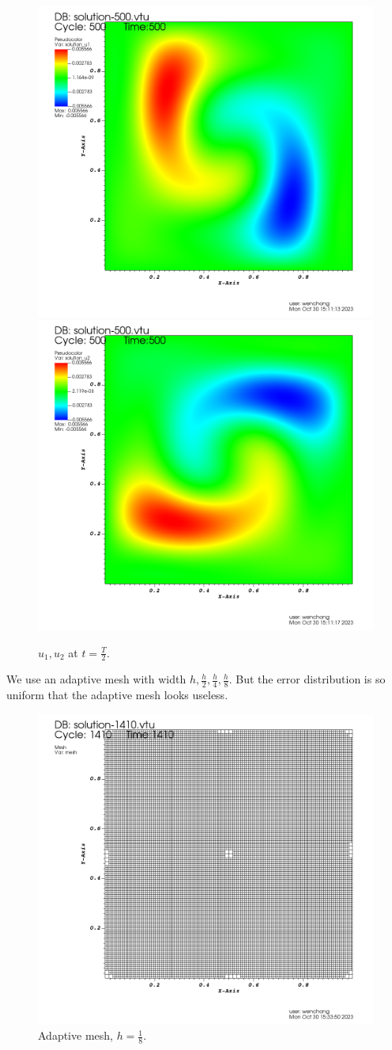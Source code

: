 \documentclass[lang=en,11pt,a4paper]{elegantpaper}
\begin{document}
\begin{figure}[H]
\begin{minipage}[t]{0.4\linewidth}
        \includegraphics[width=0.8\linewidth]{png/ux_t=0.5.png}
        \includegraphics[width=0.8\linewidth]{png/uy_t=0.5.png}
        \caption*{\small $u_1,u_2$ at $t=\frac{T}{2}$.}
    \end{minipage}
\end{figure}

We use an adaptive mesh with width $h,\frac{h}{2},\frac{h}{4},\frac{h}{8}$. 
But the error distribution is so uniform that the adaptive mesh looks useless.
\begin{figure}[H]
    \centering
    \includegraphics[width=0.5\linewidth]{png/mesh.png}
    \caption*{\small Adaptive mesh, $h=\frac{1}{8}$.}
\end{figure}
\end{document}
